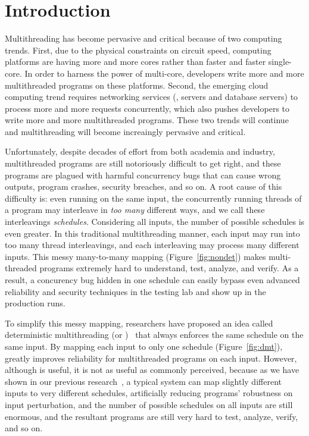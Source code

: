 \chapter{Introduction} \label{sec:intro}

Multithreading has become pervasive and critical because of two computing
trends. First, due to the physical constraints on circuit speed, computing
platforms are having more and more cores rather than faster and faster
single-core. In order to harness the power of multi-core, developers write more
and more multithreaded programs on these platforms. Second, the emerging cloud
computing trend requires networking services (\eg, \http servers and database
servers) to process more and more requests concurrently, which also pushes
developers to write more and more multithreaded programs. These two trends will
continue and multithreading will become increaingly pervasive and critical.

Unfortunately, despite decades of effort from both academia and industry,
multithreaded programs are still notoriously difficult to get right, and these
programs are plagued with harmful concurrency bugs that can cause wrong outputs,
program crashes, security breaches, and so on. A root cause of this difficulty
is: even running on the same input, the concurrently running threads of a
program may interleave in \emph{too many} different ways, and we call these
interleavings \emph{schedules}. Considering all inputs, the number of possible
schedules is even greater. In this traditional multithreading manner, each
input may run into too many thread interleavings, and each interleaving may
process many different inputs. This messy many-to-many mapping
(Figure~\ref{fig:nondet}) makes multi-threaded programs extremely hard to
understand, test, analyze, and verify. As a result, a concurency bug hidden in
one schedule can easily bypass even advanced reliability and security techniques
in the testing lab and show up in the production runs.

To simplify this messy mapping, researchers have proposed an idea called
deterministic multithreading (or \dmt)~\cite{dthreads:sosp11, dpj:oopsla09,
dmp:asplos09, kendo:asplos09, coredet:asplos10} that always enforces the same
schedule on the same input. By mapping each input to only one schedule
(Figure~\ref{fig:dmt}), \dmt greatly improves reliability for multithreaded
programs on each input. However, although \dmt is useful, it is not as useful as
commonly perceived, because as we have shown in our previous
research~\cite{cui:tern:osdi10}, a typical \dmt system can map slightly
different inputs to very different schedules, artificially reducing programs'
robustness on input perturbation, and the number of possible schedules on all
inputs are still enormous, and the resultant programs are still very hard to
test, analyze, verify, and so on.

